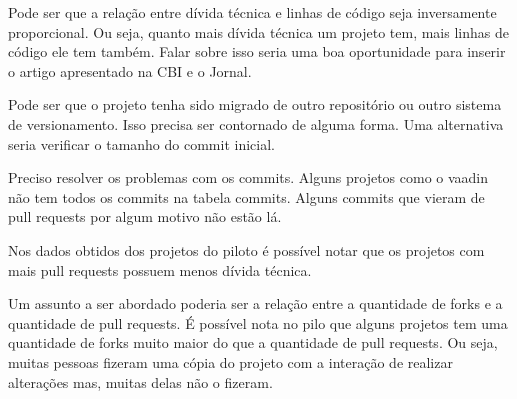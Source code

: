 Pode ser que a relação entre dívida técnica e linhas de código seja inversamente proporcional. Ou seja, quanto mais dívida técnica um projeto tem, mais linhas de código ele tem também. Falar sobre isso seria uma boa oportunidade para inserir o artigo apresentado na CBI e o Jornal.

Pode ser que o projeto tenha sido migrado de outro repositório ou outro sistema de versionamento. Isso precisa ser contornado de alguma forma. Uma alternativa seria verificar o tamanho do commit inicial.


Preciso resolver os problemas com os commits. Alguns projetos como o vaadin não tem todos os commits na tabela commits. Alguns commits que vieram de pull requests por algum motivo não estão lá.

Nos dados obtidos dos projetos do piloto é possível notar que os projetos com mais pull requests possuem menos dívida técnica.

Um assunto a ser abordado poderia ser a relação entre a quantidade de forks e a quantidade de pull requests. É possível nota no pilo que alguns projetos tem uma quantidade de forks muito maior do que a quantidade de pull requests. Ou seja, muitas pessoas fizeram uma cópia do projeto com a interação de realizar alterações mas, muitas delas não o fizeram.

